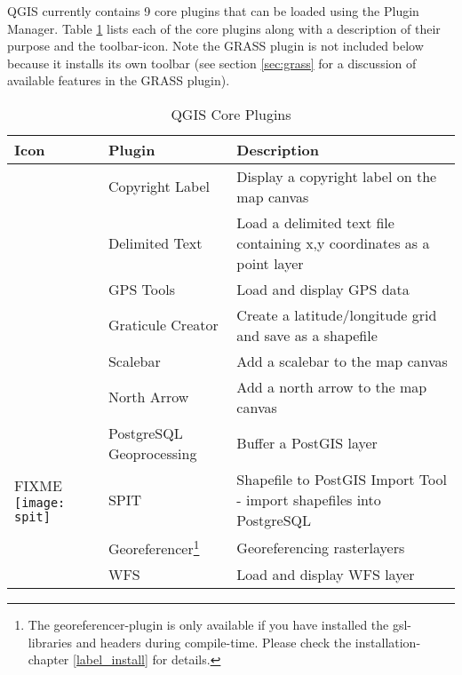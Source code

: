 QGIS currently contains 9 core plugins that can be loaded using the Plugin Manager.
Table \ref{tab:core_plugins} lists each of the core plugins along with a description of their purpose and the toolbar-icon.
Note the GRASS plugin is not included below because it installs its own toolbar (see section \ref{sec:grass} for a discussion of available features in the GRASS plugin).

\begin{minipage}{\textwidth}
\begin{table}[H]
\centering
\caption{QGIS Core Plugins}\label{tab:core_plugins}\medskip
\small
 \begin{tabular}{|l|l|p{4in}|}
\hline \textbf{Icon} & \textbf{Plugin} & \textbf{Description} \\
\hline 
 & Copyright Label \index{plugins!copyright}& Display a copyright label on the map canvas\\
\hline 
 & Delimited Text \index{plugins!delimited text}& Load a delimited text file containing x,y coordinates as a point layer \\
\hline 
 & GPS Tools \index{plugins!gps}& Load and display GPS data \\
\hline 
 & Graticule Creator \index{plugins!graticule}& Create a latitude/longitude grid and save as a shapefile\\
\hline 
 & Scalebar \index{plugins!scalebar}& Add a scalebar to the map canvas\\
\hline 
& North Arrow \index{plugins!north arrow}& Add a north arrow to the map canvas\\
\hline 
 & PostgreSQL Geoprocessing \index{plugins!geoprocessing}& Buffer a PostGIS layer \\
\hline 
FIXME \texttt{[image: spit]} & SPIT \index{plugins!SPIT}& Shapefile to PostGIS Import Tool - import shapefiles into PostgreSQL\\
\hline
 & Georeferencer\footnote{The
georeferencer-plugin is only available if you have installed the
gsl-libraries and headers during compile-time. Please check the
installation-chapter \ref{label_install} for details.} \index{plugin!Georeferencer} & Georeferencing rasterlayers \\
\hline
 & WFS & Load and display WFS layer \\
\hline
\end{tabular}
\end{table}
\end{minipage}

